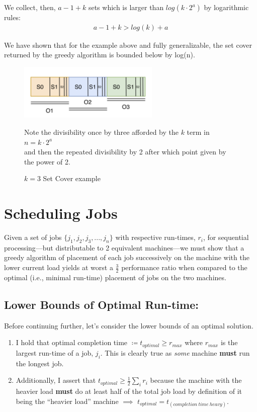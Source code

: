\documentclass[conference]{styles/acmsiggraph}
\newcommand{\?}{\stackrel{?}{=}}
\begin{document}
We collect, then, $a-1+k$ sets which is larger than $log(k\cdot2^a)$ by logarithmic rules:
\begin{align}
    a-1+k > log(k) + a
\end{align}

We have shown that for the example above and fully generalizable, the set cover returned by the greedy algorithm is bounded below by log(n).

\begin{figure}[h!]
    \centering
    \includegraphics[width=0.6\textwidth]{Problem 5 Figures/p3 fig/CS124 PSET1_3 Diagrams (1).png}
    \caption{$k=3$ Set Cover example}
    Note the divisibility once by three afforded by the $k$ term in $n = k\cdot 2^a$\\ and then the repeated divisibility by 2 after which point given by the power of 2.
    \label{setcover}
\end{figure}
\FloatBarrier





\newpage

\section{Scheduling Jobs}
Given a set of jobs $\{j_1, j_2, j_3, ..., j_n\}$ with respective run-times, $r_i$, for sequential processing---but distributable to 2 equivalent machines---we must show that a greedy algorithm of placement of each job successively on the machine with the lower current load yields at worst a $\frac{3}{2}$ performance ratio when compared to the optimal (i.e., minimal run-time) placement of jobs on the two machines.

\subsection{Lower Bounds of Optimal Run-time:} \label{section:lowerBound}
Before continuing further, let's consider the lower bounds of an optimal solution.
\begin{enumerate}
    \item I hold that optimal completion time $\coloneq t_{optimal} \geq r_{max}$ where $r_{max}$ is the largest run-time of a job, $j_i$.  This is clearly true as \textit{some} machine \textbf{must} run the longest job.
    \item Additionally, I assert that $t_{optimal} \geq \frac{1}{2} \sum_{i}r_i$ because the machine with the heavier load \textbf{must} do at least half of the total job load by definition of it being the \enquote{heavier load} machine $\implies$ $t_{optimal} = t_{(completion\ time\ heavy)}$.
\end{enumerate}
\end{document}
